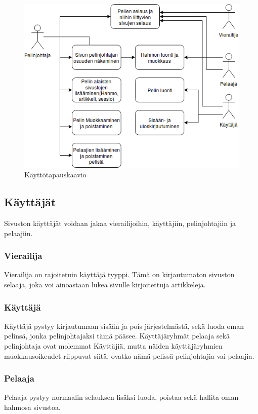 \documentclass[11pt]{article}
\begin{document}
\begin{figure}[H]
\centering
\includegraphics[scale=0.5]{pictures/kayttotapauskaavio.png}
\caption{Käyttötapauskaavio}
\end{figure}

\subsection{Käyttäjät}
Sivuston käyttäjät voidaan jakaa vierailijoihin, käyttäjiin, pelinjohtajiin ja pelaajiin.
\subsubsection{Vierailija}
Vierailija on rajoitetuin käyttäjä tyyppi. Tämä on kirjautumaton sivuston selaaja, joka voi ainoastaan lukea sivulle kirjoitettuja artikkeleja.

\subsubsection{Käyttäjä}
Käyttäjä pystyy kirjautumaan sisään ja pois järjestelmästä, sekä luoda oman pelinsä, jonka pelinjohtajaksi tämä pääsee. Käyttäjäryhmät pelaaja sekä pelinjohtaja ovat molemmat Käyttäjiä, mutta näiden käyttäjäryhmien muokkausoikeudet riippuvat siitä, ovatko nämä pelissä pelinjohtajia vai pelaajia.

\subsubsection{Pelaaja}
Pelaaja pystyy normaalin selauksen lisäksi luoda, poistaa sekä hallita oman hahmosa sivustoa.
\end{document}
